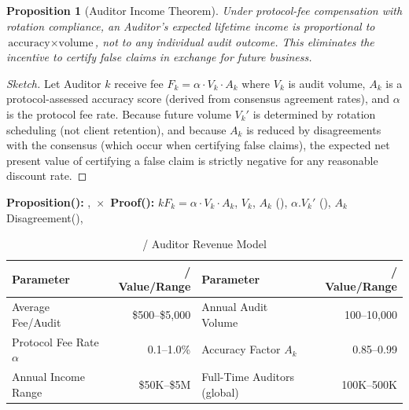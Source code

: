 \documentclass[12pt,a4paper]{article}
\newtheorem{proposition}[theorem]{Proposition}
\theoremstyle{remark}
\begin{document}
\subsection{}
\begin{proposition}[Auditor Income Theorem]
Under protocol-fee compensation with rotation compliance, an Auditor's expected lifetime 
income is proportional to $\text{accuracy} \times \text{volume}$, not to any individual 
audit outcome. This eliminates the incentive to certify false claims in exchange for 
future business.
\end{proposition}
\begin{proof}[Sketch]
Let Auditor $k$ receive fee $F_k = \alpha \cdot V_k \cdot A_k$ where $V_k$ is audit volume, 
$A_k$ is a protocol-assessed accuracy score (derived from consensus agreement rates), and 
$\alpha$ is the protocol fee rate. Because future volume $V_k'$ is determined by rotation 
scheduling (not client retention), and because $A_k$ is reduced by disagreements with the 
consensus (which occur when certifying false claims), the expected net present value of 
certifying a false claim is strictly negative for any reasonable discount rate.
\end{proof}
\medskip
\textbf{Proposition(): }
, $\text{} \times \text{}$
\textbf{Proof(): }
$k$$F_k = \alpha \cdot V_k \cdot A_k$, $V_k$, $A_k$
(), $\alpha$.$V_k'$
(), $A_k$Disagreement(), 
\begin{table}[H]
\centering
\caption{ / Auditor Revenue Model}
\label{tab:auditor_revenue}
\begin{tabular}{@{}lrlr@{}}
\toprule
\textbf{ Parameter} & \textbf{/ Value/Range} & \textbf{ Parameter} & \textbf{/ Value/Range} \\
\midrule
 Average Fee/Audit & \$500--\$5,000 & Annual Audit Volume & 100--10,000 \\
 Protocol Fee Rate $\alpha$ & 0.1--1.0\% & Accuracy Factor $A_k$ & 0.85--0.99 \\
 Annual Income Range & \$50K--\$5M & Full-Time Auditors (global) & 100K--500K \\
\bottomrule
\end{tabular}
\end{table}
\end{document}
